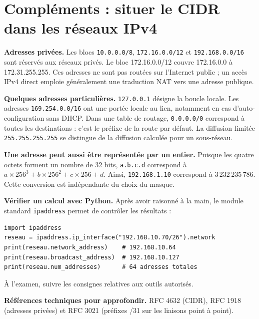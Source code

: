 \documentclass[11pt,a4paper]{article}
\newcommand{\ip}[1]{\textcolor{ipred}{\texttt{#1}}}
\begin{document}
\Needspace{6cm}
\section*{Compléments : situer le CIDR dans les réseaux IPv4}
\textbf{Adresses privées.} Les blocs \ip{10.0.0.0/8}, \ip{172.16.0.0/12} et
\ip{192.168.0.0/16} sont réservés aux réseaux privés. Le bloc 172.16.0.0/12 couvre
172.16.0.0 à 172.31.255.255. Ces adresses ne sont pas routées sur l'Internet public ;
un accès IPv4 direct emploie généralement une traduction NAT vers une adresse publique.

\textbf{Quelques adresses particulières.} \ip{127.0.0.1} désigne la boucle locale.
Les adresses \ip{169.254.0.0/16} ont une portée locale au lien, notamment en cas d'auto-configuration
sans DHCP. Dans une table de routage, \ip{0.0.0.0/0} correspond à toutes les destinations :
c'est le préfixe de la route par défaut. La diffusion limitée \ip{255.255.255.255}
se distingue de la diffusion calculée pour un sous-réseau.

\textbf{Une adresse peut aussi être représentée par un entier.} Puisque les quatre octets
forment un nombre de 32 bits, \texttt{a.b.c.d} correspond à
$a\times256^3+b\times256^2+c\times256+d$.
Ainsi, \ip{192.168.1.10} correspond à 3\,232\,235\,786.
Cette conversion est indépendante du choix du masque.

\textbf{Vérifier un calcul avec Python.} Après avoir raisonné à la main,
le module standard \texttt{ipaddress} permet de contrôler les résultats :
\begin{verbatim}
import ipaddress
reseau = ipaddress.ip_interface("192.168.10.70/26").network
print(reseau.network_address)    # 192.168.10.64
print(reseau.broadcast_address)  # 192.168.10.127
print(reseau.num_addresses)      # 64 adresses totales
\end{verbatim}
À l'examen, suivre les consignes relatives aux outils autorisés.

\textbf{Références techniques pour approfondir.} RFC 4632 (CIDR), RFC 1918 (adresses privées)
et RFC 3021 (préfixes /31 sur les liaisons point à point).
\end{document}
